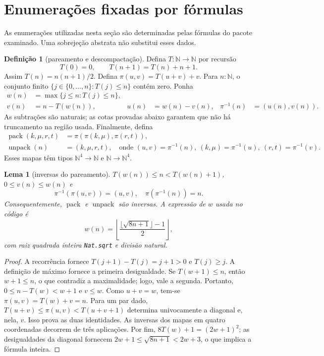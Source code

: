 \documentclass[12pt,a4paper]{article}
\theoremstyle{preciso}
\newtheorem{lema}[teorema]{Lema}
\theoremstyle{definition}
\newtheorem{definicao}[teorema]{Definição}
\newcommand{\N}{\mathbb N}
\newcommand{\code}[1]{\nolinkurl{#1}}
\theoremstyle{preciso}
\theoremstyle{preciso}
\theoremstyle{preciso}
\theoremstyle{preciso}
\theoremstyle{definition}
\theoremstyle{preciso}
\theoremstyle{definition}
\theoremstyle{preciso}
\theoremstyle{preciso}
\theoremstyle{definition}
\begin{document}
\section{Enumerações fixadas por fórmulas}
\label{normalizacao:sec:enumeration}

As enumerações utilizadas nesta seção são determinadas pelas fórmulas do
pacote examinado. Uma sobrejeção abstrata não substitui esses dados.

\begin{definicao}[pareamento e descompactação]\label{map:normalizacao:4.1}
Defina $T:\N\to\N$ por recursão
\[
 T(0)=0,\qquad T(n+1)=T(n)+n+1.
\]
Assim $T(n)=n(n+1)/2$. Defina
$\pi(u,v)=T(u+v)+v$. Para $n:\N$, o conjunto finito
$\{j\in\{0,\ldots,n\}:T(j)\le n\}$ contém zero. Ponha
\begin{align*}
 w(n)&=\max\{j\le n:T(j)\le n\},\\
 v(n)&=n-T(w(n)),& u(n)&=w(n)-v(n),&
 \pi^{-1}(n)&=(u(n),v(n)).
\end{align*}
As subtrações são naturais; as cotas provadas abaixo garantem que não
há truncamento na região usada. Finalmente, defina
\begin{align*}
 \operatorname{pack}(k,\mu,r,t)&=\pi(\pi(k,\mu),\pi(r,t)),\\
 \operatorname{unpack}(n)&=(k,\mu,r,t),
 \quad\text{onde }(u,v)=\pi^{-1}(n),\ (k,\mu)=\pi^{-1}(u),\
 (r,t)=\pi^{-1}(v).
\end{align*}
Esses mapas têm tipos $\N^4\to\N$ e $\N\to\N^4$.
\end{definicao}

\begin{lema}[inversas do pareamento]\label{map:normalizacao:4.2}\label{normalizacao:lem:pair}
$T(w(n))\le n<T(w(n)+1)$, $0\le v(n)\le w(n)$ e
\[
 \pi^{-1}(\pi(u,v))=(u,v),\quad
 \pi(\pi^{-1}(n))=n.
\]
Consequentemente, $\operatorname{pack}$ e $\operatorname{unpack}$
são inversas. A expressão de $w$ usada no código é
\[
 w(n)=\left\lfloor
 \frac{\lfloor\sqrt{8n+1}\rfloor-1}{2}\right\rfloor,
\]
com raiz quadrada inteira \code{Nat.sqrt} e divisão natural.
\end{lema}
\begin{proof}
A recorrência fornece $T(j+1)-T(j)=j+1>0$ e $T(j)\ge j$.
A definição de máximo fornece a primeira desigualdade. Se
$T(w+1)\le n$, então $w+1\le n$, o que contradiz a maximalidade;
logo, vale a segunda. Portanto, $0\le n-T(w)<w+1$ e $v\le w$.
Como $u+v=w$, tem-se $\pi(u,v)=T(w)+v=n$.
Para um par dado, $T(u+v)\le\pi(u,v)<T(u+v+1)$ determina
univocamente a diagonal e, nela, $v$. Isso prova as duas identidades.
As inversas dos mapas em quatro coordenadas decorrem de três aplicações.
Por fim, $8T(w)+1=(2w+1)^2$; as desigualdades da diagonal fornecem
$2w+1\le\sqrt{8n+1}<2w+3$, o que implica a fórmula inteira.
\end{proof}
\end{document}
